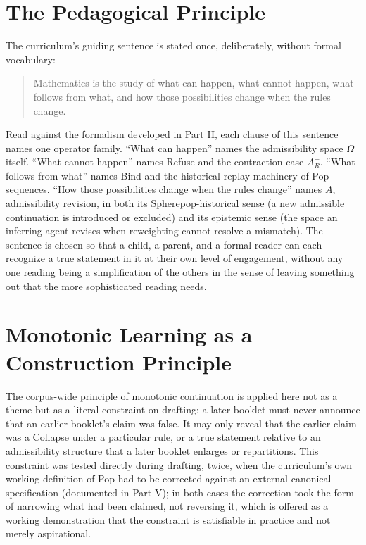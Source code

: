 \documentclass[11pt,twoside]{book}
\begin{document}
\section{The Pedagogical Principle}

The curriculum's guiding sentence is stated once, deliberately, without formal vocabulary:

\begin{quote}
Mathematics is the study of what can happen, what cannot happen, what follows from what, and how those possibilities change when the rules change.
\end{quote}

Read against the formalism developed in Part II, each clause of this sentence names one operator family. ``What can happen'' names the admissibility space $\Omega$ itself. ``What cannot happen'' names Refuse and the contraction case $A_R^-$. ``What follows from what'' names Bind and the historical-replay machinery of Pop-sequences. ``How those possibilities change when the rules change'' names $A$, admissibility revision, in both its Spherepop-historical sense (a new admissible continuation is introduced or excluded) and its epistemic sense (the space an inferring agent revises when reweighting cannot resolve a mismatch). The sentence is chosen so that a child, a parent, and a formal reader can each recognize a true statement in it at their own level of engagement, without any one reading being a simplification of the others in the sense of leaving something out that the more sophisticated reading needs.

\section{Monotonic Learning as a Construction Principle}

The corpus-wide principle of monotonic continuation is applied here not as a theme but as a literal constraint on drafting: a later booklet must never announce that an earlier booklet's claim was false. It may only reveal that the earlier claim was a Collapse under a particular rule, or a true statement relative to an admissibility structure that a later booklet enlarges or repartitions. This constraint was tested directly during drafting, twice, when the curriculum's own working definition of Pop had to be corrected against an external canonical specification (documented in Part V); in both cases the correction took the form of narrowing what had been claimed, not reversing it, which is offered as a working demonstration that the constraint is satisfiable in practice and not merely aspirational.
\end{document}
